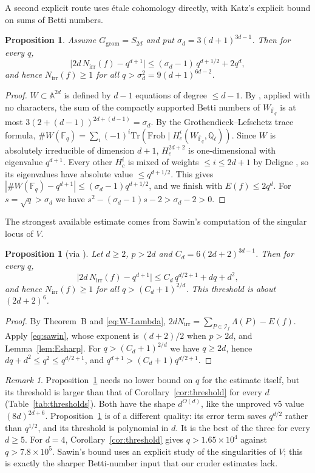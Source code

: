 \documentclass[11pt,a4paper]{article}
\newtheorem{proposition}[theorem]{Proposition}
\theoremstyle{definition}
\theoremstyle{remark}
\newtheorem{remark}[theorem]{Remark}
\newcommand{\Fq}{\mathbb{F}_q}
\newcommand{\Fqbar}{\overline{\mathbb{F}}_q}
\newcommand{\A}{\mathbb{A}}
\newcommand{\Tr}{\mathrm{Tr}}
\newcommand{\Ggeom}{G_{\mathrm{geom}}}
\newcommand{\Nirr}{N_{\mathrm{irr}}}
\newcommand{\cI}{\mathcal{I}}
\begin{document}
A second explicit route uses étale cohomology directly, with Katz's explicit bound on
sums of Betti numbers.

\begin{proposition}\label{prop:katz}
Assume $\Ggeom=S_{2d}$ and put $\sigma_d=3(d+1)^{3d-1}$. Then for every $q$,
\[
 \bigl|2d\,\Nirr(f)-q^{d+1}\bigr|\le(\sigma_d-1)\,q^{d+1/2}+2q^d,
\]
and hence $\Nirr(f)\ge1$ for all $q>\sigma_d^2=9(d+1)^{6d-2}$.
\end{proposition}

\begin{proof}
$W\subset\A^{2d}$ is defined by $d-1$ equations of degree $\le d-1$. By \cite[Theorem~12 and the
remark following it]{Katz2001}, applied with no characters, the sum of the compactly supported Betti
numbers of $W_{\Fqbar}$ is at most $3(2+(d-1))^{2d+(d-1)}=\sigma_d$. By the Grothendieck--Lefschetz
trace formula, $\#W(\Fq)=\sum_i(-1)^i\Tr(\mathrm{Frob}\mid H^i_c(W_{\Fqbar},\mathbb Q_\ell))$.
Since $W$ is absolutely irreducible of dimension $d+1$, $H^{2d+2}_c$ is one-dimensional with
eigenvalue $q^{d+1}$. Every other $H^i_c$ is mixed of weights $\le i\le 2d+1$ by Deligne
\cite[Thm.~3.3.1]{Deligne1980}, so its eigenvalues have absolute value $\le q^{d+1/2}$.
This gives $|\#W(\Fq)-q^{d+1}|\le(\sigma_d-1)q^{d+1/2}$, and we finish with $E(f)\le2q^d$.
For $s=\sqrt q>\sigma_d$ we have $s^2-(\sigma_d-1)s-2>\sigma_d-2>0$.
\end{proof}

The strongest available estimate comes from Sawin's computation of the singular locus of $V$.

\begin{proposition}[via {\cite[Cor.~4.7]{Sawin2021}}]\label{prop:sawin}
Let $d\ge2$, $p>2d$ and $C_d=6(2d+2)^{3d-1}$. Then for every $q$,
\[
 \bigl|2d\,\Nirr(f)-q^{d+1}\bigr|\le C_d\,q^{d/2+1}+dq+d^2 ,
\]
and hence $\Nirr(f)\ge1$ for all $q>(C_d+1)^{2/d}$. This threshold is about $(2d+2)^6$.
\end{proposition}

\begin{proof}
By Theorem~B and \eqref{eq:W-Lambda}, $2d\Nirr=\sum_{P\in\cI_f}\Lambda(P)-E(f)$. Apply \eqref{eq:sawin},
whose exponent is $(d+2)/2$ when $p>2d$, and Lemma~\ref{lem:Esharp}. For $q>(C_d+1)^{2/d}$ we have
$q\ge2d$, hence $dq+d^2\le q^2\le q^{d/2+1}$, and $q^{d+1}>(C_d+1)q^{d/2+1}$.
\end{proof}

\begin{remark}
Proposition~\ref{prop:katz} needs no lower bound on $q$ for the estimate itself, but its threshold
is larger than that of Corollary~\ref{cor:threshold} for every $d$ (Table~\ref{tab:thresholds}).
Both have the shape $d^{O(d)}$, like the unproved v5 value $(8d)^{2d+6}$.
Proposition~\ref{prop:sawin} is of a different quality: its error term saves $q^{d/2}$ rather than
$q^{1/2}$, and its threshold is polynomial in $d$. It is the best of the three for every $d\ge5$.
For $d=4$, Corollary~\ref{cor:threshold} gives $q>1.65\times10^4$ against $q>7.8\times10^5$.
Sawin's bound uses an explicit study of the singularities of $V$; this is exactly the sharper
Betti-number input that our cruder estimates lack.
\end{remark}
\end{document}
